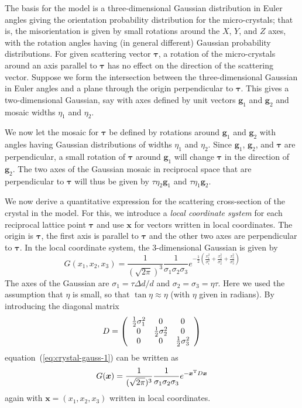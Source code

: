 The basis for the model is a three-dimensional Gaussian distribution in
Euler angles giving the orientation probability distribution for the
micro-crystals; that is, the misorientation is given by small rotations
around the $X$, $Y$, and $Z$ axes, with the rotation angles having (in
general different) Gaussian probability distributions. For given
scattering vector $\boldsymbol{\tau}$, a rotation of the micro-crystals
around an axis parallel to $\boldsymbol{\tau}$ has no effect on the
direction of the scattering vector. Suppose we form the intersection
between the three-dimensional Gaussian in Euler angles and a plane
through the origin perpendicular to $\boldsymbol{\tau}$. This gives a
two-dimensional Gaussian, say with axes defined by unit vectors
$\boldsymbol{g}_1$ and $\boldsymbol{g}_2$ and mosaic widths $\eta_1$ and
$\eta_2$.

We now let the mosaic for $\boldsymbol{\tau}$ be defined by rotations
around $\boldsymbol{g}_1$ and $\boldsymbol{g}_2$ with angles having
Gaussian distributions of widths $\eta_1$ and $\eta_2$. Since
$\boldsymbol{g}_1$, $\boldsymbol{g}_2$, and $\boldsymbol{\tau}$ are
perpendicular, a small rotation of $\boldsymbol{\tau}$ around
$\boldsymbol{g}_1$ will change $\boldsymbol{\tau}$ in the direction of
$\boldsymbol{g}_2$. The two axes of the Gaussian mosaic in reciprocal
space that are perpendicular to $\boldsymbol{\tau}$ will thus be given
by $\tau\eta_2\boldsymbol{g}_1$ and $\tau\eta_1\boldsymbol{g}_2$.

We now derive a quantitative expression for the scattering cross-section
of the crystal in the model. For this, we introduce a \emph{local
  coordinate system} for each reciprocal lattice point
$\boldsymbol{\tau}$ and use $\boldsymbol{x}$ for vectors written in local
coordinates. The origin is $\boldsymbol{\tau}$, the first axis
is parallel to $\boldsymbol{\tau}$ and the other two axes are
perpendicular to $\boldsymbol{\tau}$. In the local coordinate system,
the 3-dimensional Gaussian is given by
\begin{equation}
  \label{eq:crystal-gauss-1}
  G(x_1,x_2,x_3) = \frac{1}{(\sqrt{2\pi})^3}\frac{1}{\sigma_1\sigma_2\sigma_3}
  e^{-\frac{1}{2}(\frac{x_1^2}{\sigma_1^2} +
  \frac{x_2^2}{\sigma_2^2} + \frac{x_3^2}{\sigma_3^2})}
\end{equation}
The axes of the Gaussian are $\sigma_1 = \tau\Delta d/d$ and $\sigma_2 =
\sigma_3 = \eta\tau$. Here we used the assumption that $\eta$ is small,
so that $\tan\eta \approx \eta$ (with $\eta$ given in radians).  By
introducing the diagonal matrix
$$
D = \left(
  \begin{array}[c]{ccc}
    \frac{1}{2}\sigma_1^2 & 0 & 0 \\
    0 & \frac{1}{2}\sigma_2^2 & 0 \\
    0 & 0 & \frac{1}{2}\sigma_3^2
  \end{array}\right)
$$
equation~(\ref{eq:crystal-gauss-1}) can be written as
\begin{equation}
  G(\boldsymbol{x}) =
  \frac{1}{(\sqrt{2\pi})^3}\frac{1}{\sigma_1\sigma_2\sigma_3}
  e^{-\boldsymbol{x}^{\rm T} D \boldsymbol{x}}
\end{equation}
again with $\boldsymbol{x}=(x_1,x_2,x_3)$ written in local coordinates.

